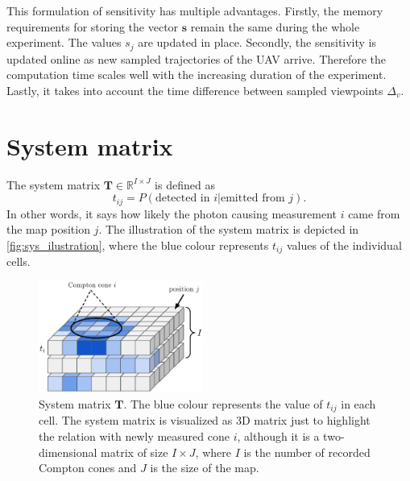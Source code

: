 This formulation of sensitivity has multiple advantages.
Firstly, the memory requirements for storing the vector $\mathbf{s}$ remain the same during the whole experiment. The values $s_{j}$ are updated in place.
Secondly, the sensitivity is updated online as new sampled trajectories of the \ac{UAV} arrive. Therefore the computation time scales well with the increasing duration of the experiment.
Lastly, it takes into account the time difference between sampled viewpoints $\Delta_{v}$.%

\section{System matrix}
\label{sec:system}
The system matrix $\mathbf{T} \in \mathbb{R}^{I \times J}$ is defined as
\begin{equation}
t_{ij} =  P(\textrm{detected in } i | \textrm{emitted from } j).
\end{equation}
In other words, it says how likely the photon causing measurement $i$ came from the map position $j$.
The illustration of the system matrix is depicted in  \autoref{fig:sys_ilustration}, where the blue colour represents $t_{ij}$ values of the individual cells. 
\begin{figure}[!h]
  \centering
    \includegraphics[width=0.48\textwidth]{./fig/photos/systemmmm.eps}
  \caption{System matrix $\mathbf{T}$. The blue colour represents the value of $t_{ij}$ in each cell. The system matrix is visualized as 3D matrix just to highlight the relation with newly measured cone $i$, although it is a two-dimensional matrix of size $I \times J$, where $I$ is the number of recorded Compton cones and $J$ is the size of the map. }
    \label{fig:sys_ilustration}
\end{figure}


